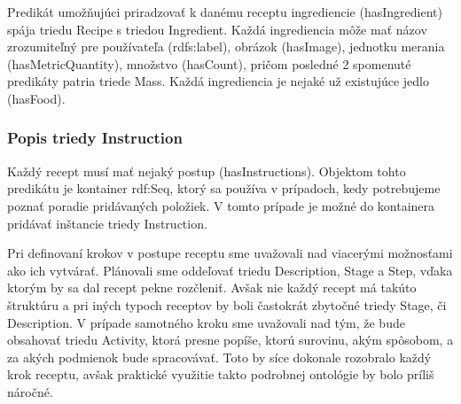 	Predikát umožňujúci priradzovať k danému receptu ingrediencie (hasIngredient) spája triedu Recipe s triedou Ingredient. Každá ingrediencia môže mať názov zrozumiteľný pre používateľa (rdfs:label), obrázok (hasImage), jednotku merania (hasMetricQuantity), množstvo (hasCount), pričom posledné 2 spomenuté predikáty patria triede Mass. Každá ingrediencia je nejaké už existujúce jedlo (hasFood).
	
\subsubsection{Popis triedy Instruction}
	Každý recept musí mať nejaký postup (hasInstructions). Objektom tohto predikátu je kontainer rdf:Seq, ktorý sa používa v prípadoch, kedy potrebujeme poznať poradie pridávaných položiek. V tomto prípade je možné do kontainera pridávať inštancie triedy Instruction.
	
	Pri definovaní krokov v postupe receptu sme uvažovali nad viacerými možnosťami ako ich vytvárať. Plánovali sme oddeľovať triedu Description, Stage a Step, vďaka ktorým by sa dal recept pekne rozčleniť. Avšak nie každý recept má takúto štruktúru a pri iných typoch receptov by boli častokrát zbytočné triedy Stage, či Description. V prípade samotného kroku sme uvažovali nad tým, že bude obsahovať triedu Activity, ktorá presne popíše, ktorú surovinu, akým spôsobom, a za akých podmienok bude spracovávať. Toto by síce dokonale rozobralo každý krok receptu, avšak praktické využitie takto podrobnej ontológie by bolo príliš náročné. 
	
